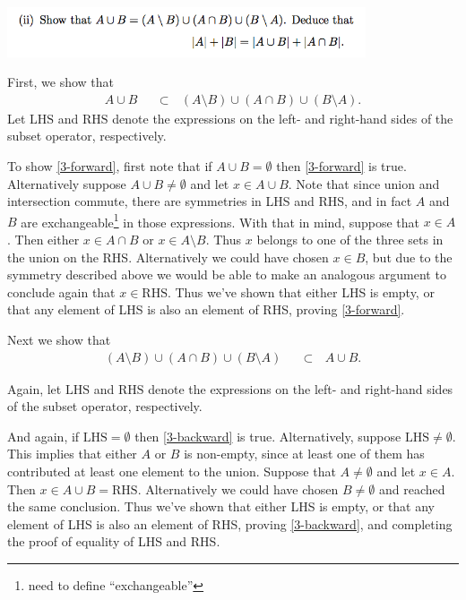 \documentclass[12pt]{article}
\newcommand{\LHS}{\text{LHS}}
\newcommand{\RHS}{\text{RHS}}
\begin{document}
\includegraphics[width=300pt]{img/iulm-1-3-ii.png}
\begin{mdframed}

First, we show that
\begin{align}
  A \cup B ~~~ &\subset ~~~ (A \setminus B) \cup (A \cap B) \cup (B \setminus A).\label{3-forward}
\end{align}
Let $\LHS$ and $\RHS$ denote the expressions on the left- and right-hand sides
of the subset operator, respectively.

To show \eqref{3-forward}, first note that if $A \cup B = \emptyset$ then
\eqref{3-forward} is true. Alternatively suppose $A \cup B \neq \emptyset$ and
let $x \in A \cup B$. Note that since union and intersection commute, there are
symmetries in LHS and RHS, and in fact $A$ and $B$ are
exchangeable\footnote{need to define ``exchangeable''} in those
expressions. With that in mind, suppose that $x \in A$. Then either
$x \in A \cap B$ or $x \in A \setminus B$. Thus $x$ belongs to one of the three
sets in the union on the RHS. Alternatively we could have chosen $x \in B$, but
due to the symmetry described above we would be able to make an analogous
argument to conclude again that $x \in \RHS$. Thus we've shown that either LHS
is empty, or that any element of LHS is also an element of RHS, proving
\eqref{3-forward}.

Next we show that
\begin{align}
  (A \setminus B) \cup (A \cap B) \cup (B \setminus A) ~~~ &\subset ~~~ A \cup B. \label{3-backward}
\end{align}

Again, let $\LHS$ and $\RHS$ denote the expressions on the left- and right-hand
sides of the subset operator, respectively.

And again, if $\LHS = \emptyset$ then \eqref{3-backward} is
true. Alternatively, suppose $\LHS \neq \emptyset$. This implies that either
$A$ or $B$ is non-empty, since at least one of them has contributed at least
one element to the union. Suppose that $A \neq \emptyset$ and let $x \in
A$. Then $x \in A \cup B = \RHS$. Alternatively we could have chosen
$B \neq \emptyset$ and reached the same conclusion. Thus we've shown that
either LHS is empty, or that any element of LHS is also an element of RHS,
proving \eqref{3-backward}, and completing the proof of equality of LHS and
RHS.
\end{mdframed}
\end{document}
